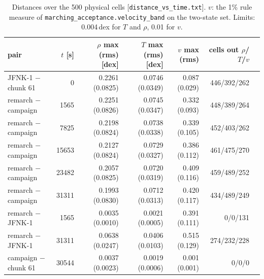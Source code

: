 \documentclass[english,a4paper]{my_memo}
\begin{document}
\begin{table}[!htbp]
\centering\small
\caption{Distances over the 500 physical cells [\texttt{distance\_vs\_time.txt}].
$v$: the 1\% rule measure of \texttt{marching\_acceptance.velocity\_band} on the two-state set.
Limits: 0.004\,dex for $T$ and $\rho$, 0.01 for $v$.}
\label{tab:dist}
\begin{tabular}{lrrrrrr}
\toprule
pair & $t$ [s] & $\rho$ max (rms) [dex] & $T$ max (rms) [dex] & $v$ max (rms) & cells out $\rho$/$T$/$v$\\
\midrule
JFNK-1 $-$ chunk 61 & 0 & 0.2261 (0.0825) & 0.0746 (0.0349) & 0.087 (0.029) & 446/392/262 \\
remarch $-$ campaign & 1565 & 0.2251 (0.0826) & 0.0745 (0.0347) & 0.332 (0.093) & 448/389/264 \\
remarch $-$ campaign & 7825 & 0.2198 (0.0824) & 0.0738 (0.0338) & 0.339 (0.105) & 452/403/262 \\
remarch $-$ campaign & 15653 & 0.2127 (0.0824) & 0.0729 (0.0327) & 0.386 (0.112) & 461/475/270 \\
remarch $-$ campaign & 23482 & 0.2057 (0.0825) & 0.0720 (0.0319) & 0.409 (0.116) & 459/489/252 \\
remarch $-$ campaign & 31311 & 0.1993 (0.0830) & 0.0712 (0.0313) & 0.420 (0.117) & 434/489/249 \\
remarch $-$ JFNK-1 & 1565 & 0.0035 (0.0010) & 0.0021 (0.0005) & 0.391 (0.111) & 0/0/131 \\
remarch $-$ JFNK-1 & 31311 & 0.0638 (0.0247) & 0.0406 (0.0103) & 0.515 (0.129) & 274/232/228 \\
campaign $-$ chunk 61 & 30544 & 0.0037 (0.0023) & 0.0019 (0.0006) & 0.001 (0.001) & 0/0/0 \\
\bottomrule
\end{tabular}
\end{table}
\end{document}
